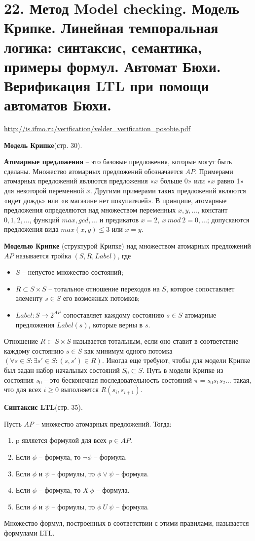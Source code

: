 \documentclass[a4paper,12pt]{article}
\begin{document}
\section*{22. Метод Model checking. Модель Крипке. Линейная темпоральная логика: cинтаксис, семантика, примеры формул. Автомат Бюхи. Верификация LTL при помощи автоматов Бюхи.}
\url{http://is.ifmo.ru/verification/velder_verification_posobie.pdf}


\textbf{Модель Крипке}(стр. 30).

\textbf{Атомарные предложения} -- это базовые
предложения, которые могут быть сделаны. Множество атомарных
предложений обозначается $AP$. Примерами атомарных предложений
являются предложения «$x$ больше 0» или «$x$ равно 1» для некоторой
переменной $x$. Другими примерами таких предложений являются
«идет дождь» или «в магазине нет покупателей». В принципе,
атомарные предложения определяются над множеством переменных
$x, y, \ldots$, констант $0, 1, 2, \ldots$, функций $max, gcd, \ldots$ и предикатов
$x = 2,\ x\ mod\ 2 = 0, \ldots$; допускаются предложения вида $max(x, y) \le 3$ или $x = y$.

\textbf{Моделью Крипке} (структурой Крипке) над множеством атомарных
предложений $AP$ называется тройка $(S, R, Label)$, где
\begin{itemize}
    \item $S$ – непустое множество состояний;
    \item $R \subset S \times S$ – тотальное отношение переходов на $S$, которое сопоставляет элементу $s \in S$ его возможных потомков;
    \item $Label: S \rightarrow 2^{AP}$ сопоставляет каждому состоянию $s \in S$ атомарные предложения $Label(s)$, которые верны в $s$.
\end{itemize}
Отношение $R \subset S \times S$ называется тотальным, если оно ставит в
соответствие каждому состоянию $s \in S$ как минимум одного потомка
$(\forall s \in S: \exists s' \in S: (s, s') \in R)$.
Иногда еще требуют, чтобы для модели Крипке был задан набор
начальных состояний $S_0 \subset S$.
Путь в модели Крипке из состояния $s_0$ – это бесконечная
последовательность состояний $\pi = s_0 s_1 s_2 \ldots$ такая, что для всех $i \ge 0$
выполняется $R(s_i, s_{i+1})$.

\textbf{Синтаксис LTL}(стр. 35).

Пусть $AP$ – множество атомарных предложений. Тогда:
\begin{enumerate}
    \item p является формулой для всех $p \in AP$.
    \item Если $\phi$ – формула, то $\lnot \phi$ – формула.
    \item Если $\phi$ и $\psi$ – формулы, то $\phi \vee \psi$ – формула.
    \item Если $\phi$ – формула, то $X\ \phi$ – формула.
    \item Если $\phi$ и $\psi$ – формулы, то $\phi\ U\ \psi$ – формула.
\end{enumerate}
Множество формул, построенных в соответствии с этими правилами,
называется формулами LTL.
\end{document}
